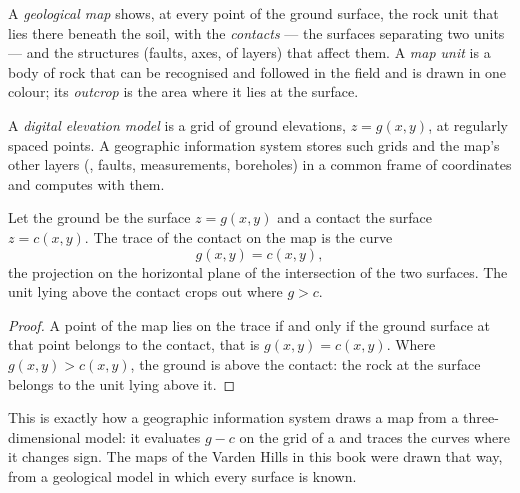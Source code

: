 \begin{definition}\label{def:b1:geological-maps:geological-map}
A \emph{geological map} shows, at every point of the
ground surface, the rock unit that lies there beneath the soil, with the
\emph{contacts} --- the surfaces separating two
units --- and the structures (faults,  axes,  of layers) that
affect them. A \emph{map unit} is a body of rock that can be
recognised and followed in the field and is drawn in one colour; its
\emph{outcrop} is the area where it lies at the surface.
\end{definition}

\begin{definition}\label{def:b1:geological-maps:dem}
A \emph{digital elevation model} is a grid of
ground elevations, $z = g(x,y)$, at regularly spaced points. A geographic
information system stores such grids and the map's other layers (,
faults, measurements, boreholes) in a common frame of coordinates and
computes with them.
\end{definition}

\begin{proposition}\label{prop:b1:geological-maps:intersection}
Let the ground be the surface $z = g(x,y)$ and a contact the surface
$z = c(x,y)$. The trace of the contact on the map is the curve
\[
  g(x,y) = c(x,y),
\]
the projection on the horizontal plane of the intersection of the two
surfaces. The unit lying above the contact crops out where $g > c$.
\end{proposition}

\begin{proof}
A point of the map lies on the trace if and only if the ground surface at
that point belongs to the contact, that is $g(x,y) = c(x,y)$. Where
$g(x,y) > c(x,y)$, the ground is above the contact: the rock at the surface
belongs to the unit lying above it.
\end{proof}

\begin{remark}\label{rem:b1:geological-maps:computed}
This is exactly how a geographic information system draws a map from a
three-dimensional model: it evaluates $g - c$ on the grid of a  and traces the curves where it changes sign. The maps of
the Varden Hills in this book were drawn that way, from a geological model
in which every surface is known.
\end{remark}

